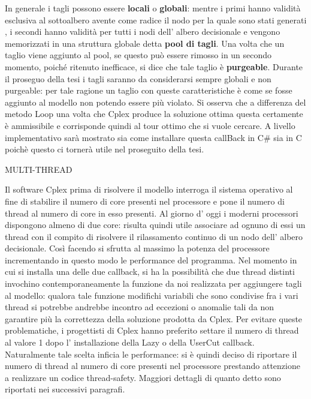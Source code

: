 \documentclass[11pt]{article}
\begin{document}
In generale i tagli possono essere \textbf{locali} o \textbf{globali}: mentre i primi hanno validità esclusiva al sottoalbero avente come radice il nodo per la quale sono stati generati , i secondi hanno validità per tutti i nodi dell' albero decisionale e vengono memorizzati in una struttura globale detta \textbf{pool di tagli}. Una volta che un taglio viene aggiunto al pool, se questo può essere rimosso in un secondo momento, poiché ritenuto inefficace, si dice che tale taglio è \textbf{purgeable}. Durante il proseguo della tesi i tagli saranno da considerarsi sempre globali e non purgeable: per tale ragione un taglio con queste caratteristiche è come se fosse aggiunto al modello non potendo essere più violato.
Si osserva che a differenza del metodo Loop una volta che Cplex produce la soluzione ottima questa certamente è ammissibile e corrisponde quindi al tour ottimo che si vuole cercare. A livello implementativo sarà  mostrato sia come installare questa callBack in C\# sia in C poichè questo ci tornerà  utile nel proseguito della tesi.

\vspace{2\baselineskip}
MULTI-THREAD
\vspace{2\baselineskip}

Il software Cplex prima di risolvere il modello interroga il sistema operativo al fine di stabilire il numero di core presenti nel processore e pone il numero di thread al numero di core in esso presenti. Al giorno d' oggi i moderni processori dispongono almeno di due core: risulta quindi utile associare ad ognuno di essi un thread con il compito di risolvere il rilassamento continuo di un nodo dell' albero decisionale. Così facendo si sfrutta al massimo la potenza del processore incrementando in questo modo le performance del programma.  
Nel momento in cui si installa una delle due callback, si ha la possibilità che due thread distinti invochino contemporaneamente la funzione da noi realizzata per aggiungere tagli al modello: qualora tale funzione modifichi variabili che sono condivise fra i vari thread si potrebbe andrebbe incontro ad eccezioni o anomalie  tali da non garantire più la correttezza della soluzione prodotta da Cplex. 
Per evitare queste problematiche, i progettisti di Cplex hanno preferito  settare il numero di thread al valore 1 dopo l' installazione della Lazy o della UserCut callback. Naturalmente tale scelta inficia le performance: si è quindi deciso di riportare il numero di thread al numero di core presenti nel processore prestando attenzione a realizzare un codice thread-safety. Maggiori dettagli di quanto detto sono riportati nei successivi paragrafi.
\end{document}
